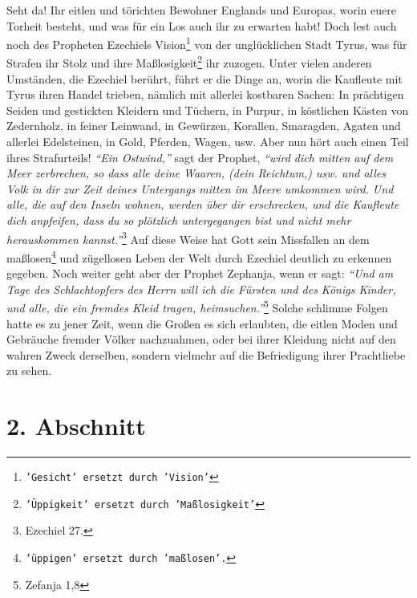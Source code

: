 Seht da! Ihr eitlen und törichten Bewohner Englands und
Europas, worin euere
Torheit besteht, und was für ein Los auch ihr zu erwarten habt! Doch lest
auch noch des Propheten Ezechiels Vision\footnote{\texttt{'Gesicht' ersetzt
durch 'Vision'}} von der unglücklichen Stadt Tyrus, was
für Strafen ihr Stolz und ihre Maßlosigkeit\footnote{\texttt{'Üppigkeit' ersetzt
durch 'Maßlosigkeit'}} ihr zuzogen. Unter vielen anderen
Umständen, die Ezechiel berührt, führt er die Dinge an, worin die Kaufleute mit
Tyrus ihren Handel trieben, nämlich mit allerlei kostbaren Sachen: In prächtigen
Seiden und gestickten Kleidern und Tüchern, in Purpur, in köstlichen Kästen von
Zedernholz, in feiner Leinwand, in Gewürzen, Korallen, Smaragden,
Agaten und
allerlei Edelsteinen, in Gold, Pferden, Wagen, usw. Aber nun hört auch einen
Teil ihres Strafurteils! \textit{"`Ein Ostwind,"'} sagt der
Prophet,
\textit{"`wird dich mitten
auf dem Meer zerbrechen, so dass alle deine Waaren, (dein Reichtum,) usw.
und alles Volk in dir zur Zeit deines Untergangs mitten im Meere umkommen wird.
Und alle, die auf den Inseln wohnen, werden über dir erschrecken, und die
Kaufleute dich anpfeifen, dass du so plötzlich untergegangen bist und nicht mehr
herauskommen kannst."'}\footnote{Ezechiel 27.}
Auf diese Weise hat Gott sein Missfallen
an dem maßlosen\footnote{\texttt{'üppigen' ersetzt durch 'maßlosen'.}} und
zügellosen Leben der Welt durch Ezechiel deutlich zu erkennen
gegeben. Noch weiter geht aber der Prophet Zephanja, wenn er sagt:
\textit{"`Und am Tage
des Schlachtopfers des Herrn will ich die Fürsten und des Königs
Kinder, und alle, die ein fremdes Kleid tragen, heimsuchen."'}\footnote{Zefanja
1,8}
Solche
schlimme Folgen hatte es zu jener Zeit, wenn die Großen es sich erlaubten, die
eitlen Moden und Gebräuche fremder Völker nachzuahmen, oder bei ihrer
Kleidung
nicht auf den wahren Zweck derselben, sondern vielmehr auf die Befriedigung
ihrer Prachtliebe zu sehen.

\section{2. Abschnitt} \label{kap15_ab2}


